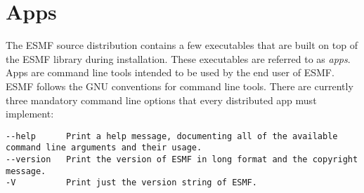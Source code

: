 
\section{Apps}
\label{sec:Apps}

The ESMF source distribution contains a few executables that are built on top
of the ESMF library during installation. These executables are referred to as
{\em apps}. Apps are command line tools intended to be used by the end user of
ESMF. ESMF follows the GNU conventions for command line tools. There are 
currently three mandatory command line options that every distributed app must
implement:

\begin{verbatim}
--help      Print a help message, documenting all of the available command line arguments and their usage.
--version   Print the version of ESMF in long format and the copyright message.
-V          Print just the version string of ESMF.
\end{verbatim}
